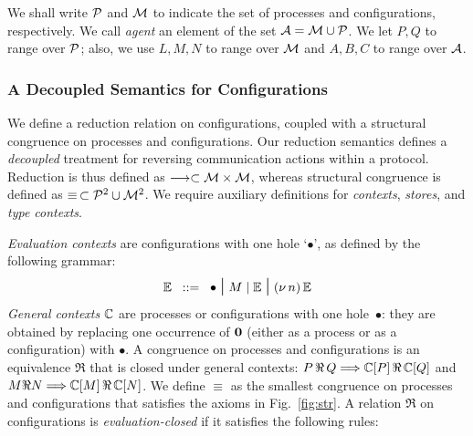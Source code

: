 \documentclass[runningheads]{llncs}
\begin{document}
\noindent
We shall write $\mathcal{P}$ and $\mathcal{M}$ to indicate the set of processes and configurations, respectively. 
We call \emph{agent} an element of the set $\mathcal{A} = \mathcal{M} \cup \mathcal{P}$. 
We let $P, Q$  to range over $\mathcal{P}$; also, we use $L,M,N$ to range over $\mathcal{M}$ and $A,B,C$ to range over $\mathcal{A}$.





\subsubsection{A Decoupled Semantics for Configurations}\label{ss:semconf}
We define a reduction relation on configurations, coupled with a structural congruence
 on processes and configurations.
Our reduction semantics defines a \emph{decoupled} treatment for reversing communication actions within a protocol.
Reduction is thus defined as $\longrightarrow \subset \mathcal{M} \times \mathcal{M}$, whereas structural congruence is defined as $\equiv\, \subset \mathcal{P}^{2} \cup \mathcal{M}^{2}$.  We require auxiliary definitions for \emph{contexts}, \emph{stores}, and \emph{type contexts}.

\emph{Evaluation contexts} are configurations with one hole 
 `$\bullet$', as defined by the following grammar:
$$\mathbb{E}\;\;::=\;\; \bullet \;\mbox{\Large{$\mid$}}\; M\;|\; \mathbb{E} \;\mbox{\Large{$\mid$}}\; (\nu\, n)\, \mathbb{E}$$
\emph{General contexts} $\mathbb{C}$ are processes or configurations with one hole~$\bullet$: they are obtained  by replacing one occurrence of $\mathbf{0}$ (either as a process or as a configuration) with $\bullet$.
A congruence on processes and configurations is an equivalence  $\Re$ that is closed under general contexts: $P \,\Re\,  Q \Longrightarrow \mathbb{C}[P]\,\Re\,  \mathbb{C}[Q]$
and $M\Re N \Longrightarrow \mathbb{C}[M]\,\Re\,  \mathbb{C}[N]$.
We define $\equiv$  as the smallest congruence on processes and configurations
that satisfies the axioms in Fig.~\ref{fig:str}. 
A relation $\Re$ on configurations is \emph{evaluation-closed} if it satisfies the   following rules:
\end{document}
